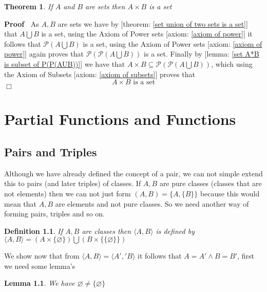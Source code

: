 \documentclass{book}
\newenvironment{proof}{\noindent\textbf{Proof\ }}{\hspace*{\fill}$\Box$\medskip}
\newtheorem{definition}{Definition}
{\theorembodyfont{\rmfamily}\newtheorem{example}{Example}}
\newtheorem{lemma}{Lemma}
\newtheorem{theorem}{Theorem}
\begin{document}
\begin{theorem}
  \label{set A*B}If $A$ and $B$ are sets then $A \times B$ is a set
\end{theorem}

\begin{proof}
  As $A, B$ are sets we have by [theorem: \ref{set union of two sets is a
  set}] that $A \bigcup B$ is a set, using the Axiom of Power sets [axiom:
  \ref{axiom of power}] it follows that $\mathcal{P} \left( A \bigcup B
  \right)$ is a set, using the Axiom of Power sets [axiom: \ref{axiom of
  power}] again proves that $\mathcal{P} \left( \mathcal{P} \left( A \bigcup B
  \right) \right)$ is a set. Finally by [lemma: \ref{set A*B is subset of
  P(P(AUB))}] we have that $A \times B \subseteq \mathcal{P} \left(
  \mathcal{P} \left( A \bigcup B \right) \right)$, which using the Axiom of
  Subsets [axiom: \ref{axiom of subsets}] proves that
  \[ A \times B \text{ is a set} \]
\end{proof}

\chapter{Partial Functions and Functions}

\section{Pairs and Triples}

Although we have already defined the concept of a pair, we can not simple
extend this to pairs (and later triples) of classes. If $A, B$ are pure
classes (classes that are not elements) then we can not just form $(A, B) = \{
A, \{ B \} \}$ because this would mean that $A, B$ are elements and not pure
classes. So we need another way of forming pairs, triples and so on.

\begin{definition}
  If $A, B$ are classes then $\langle A, B \rangle$ is defined by $\langle A,
  B \rangle = (A \times \{ \varnothing \}) \bigcup (B \times \{ \{ \varnothing
  \} \})$
\end{definition}

We show now that from $\langle A, B \rangle = \langle A',' B \rangle$ it
follows that $A = A' \wedge B = B'$, first we need some lemma's

\begin{lemma}
  \label{set emptyset is not set of empty set}We have $\varnothing \neq \{
  \varnothing \}$
\end{lemma}
\end{document}
